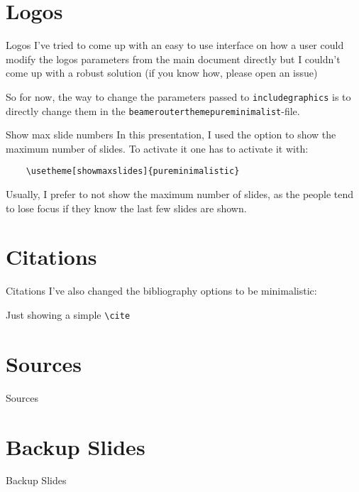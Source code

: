 \documentclass[aspectratio=169]{beamer}
\begin{document}
\section{Logos}
\begin{frame}[fragile]{Logos}
  I've tried to come up with an easy to use interface on how
  a user could modify the logos parameters
  from the main document directly
  but I couldn't come up with a robust solution (if you know
  how, please open an issue)

  So for now, the way to change the parameters passed
  to \texttt{includegraphics} is to directly change them
  in the \texttt{beamerouterthemepureminimalist}-file.
\end{frame}

\begin{frame}[fragile]{Show max slide numbers}
  In this presentation, I used the option to
  show the maximum number of slides. To activate it
  one has to activate it with:
  \begin{verbatim}
    \usetheme[showmaxslides]{pureminimalistic}
    \end{verbatim}
  Usually, I prefer to not show the maximum number of
  slides, as the people tend to lose focus if they know
  the last few slides are shown.
\end{frame}

\section{Citations}
\begin{frame}{Citations}
  I've also changed the bibliography options to be minimalistic:

  Just showing a simple \texttt{\textbackslash{}cite} \cite{AlexNet}
\end{frame}

\section*{Sources}
\begin{frame}[allowframebreaks]{Sources}
  \small
  \printbibliography
\end{frame}

\appendix %
\section*{Backup Slides}
\begin{frame}
  \centering
  \vfill
  {\fontsize{40}{50}\selectfont Backup Slides}
  \vfill
\end{frame}
\end{document}
